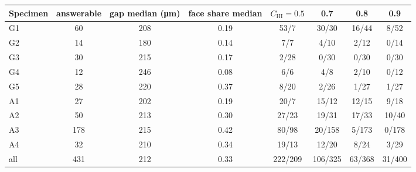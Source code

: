 \begin{tabular}{lccccccc}
\toprule
Specimen & answerable & gap median (\si{\micro\meter}) & face share median & $C_\mathrm{HI}=0.5$ & 0.7 & 0.8 & 0.9 \\
\midrule
G1 & 60 & 208 & 0.19 & 53/7 & 30/30 & 16/44 & 8/52 \\
G2 & 14 & 180 & 0.14 & 7/7 & 4/10 & 2/12 & 0/14 \\
G3 & 30 & 215 & 0.17 & 2/28 & 0/30 & 0/30 & 0/30 \\
G4 & 12 & 246 & 0.08 & 6/6 & 4/8 & 2/10 & 0/12 \\
G5 & 28 & 220 & 0.37 & 8/20 & 2/26 & 1/27 & 1/27 \\
A1 & 27 & 202 & 0.19 & 20/7 & 15/12 & 12/15 & 9/18 \\
A2 & 50 & 213 & 0.30 & 27/23 & 19/31 & 17/33 & 10/40 \\
A3 & 178 & 215 & 0.42 & 80/98 & 20/158 & 5/173 & 0/178 \\
A4 & 32 & 210 & 0.34 & 19/13 & 12/20 & 8/24 & 3/29 \\
all & 431 & 212 & 0.33 & 222/209 & 106/325 & 63/368 & 31/400 \\
\bottomrule
\end{tabular}
